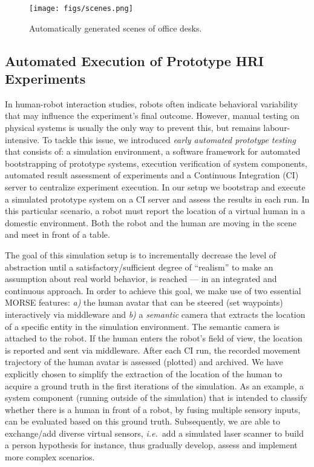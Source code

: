 \documentclass{llncs}
\newcommand{\ie}{{\textit{i.e.~}}}
\begin{document}
\begin{figure}[t]
  \centering
  \texttt{[image: figs/scenes.png]}
  \caption{Automatically generated scenes of office desks.}
  \label{fig:simulated-desktop-scenes}
\end{figure}


\subsection{Automated Execution of Prototype HRI Experiments}
\label{sc:ci}

In human-robot interaction studies, robots often indicate behavioral variability
that may influence the experiment's final outcome.  However, manual testing on
physical systems is usually the only way to prevent this, but remains
labour-intensive. To tackle this issue, we introduced \emph{early automated
prototype testing}~\cite{2645922} that consists of: a simulation environment, a
software framework for automated bootstrapping of prototype systems, execution
verification of system components, automated result assessment of experiments
and a Continuous Integration (CI) server to centralize experiment execution. In
our setup we bootstrap and execute a simulated prototype system on a CI server
and assess the results in each run. In this particular scenario, a robot must
report the location of a virtual human in a domestic environment. Both the
robot and the human are moving in the scene and meet in front of a table.


The goal of this simulation setup is to incrementally decrease the level of
abstraction until a satisfactory/sufficient degree of ``realism'' to make an
assumption about real world behavior, is reached --- in an integrated and
continuous approach. In order to achieve this goal, we make use of two essential
MORSE features: \textit{a)} the human avatar that can be steered (set waypoints)
interactively via middleware and \textit{b)} a \emph{semantic} camera that
extracts the location of a specific entity in the simulation environment. The
semantic camera is attached to the robot. If the human enters the robot's field
of view, the location is reported and sent via middleware. After each CI run,
the recorded movement trajectory of the human avatar is assessed (plotted) and
archived. We have explicitly chosen to simplify the extraction of the location
of the human to acquire a ground truth in the first iterations of the
simulation. As an example, a system component (running outside of the simulation) 
that is intended to classify whether there is a human in front of a robot, by fusing 
multiple sensory inputs, can be evaluated based on this ground truth. Subsequently, 
we are able to exchange/add diverse virtual sensors, \ie add a simulated laser 
scanner to build a person hypothesis for instance, thus gradually develop, 
assess and implement more complex scenarios.
\end{document}
